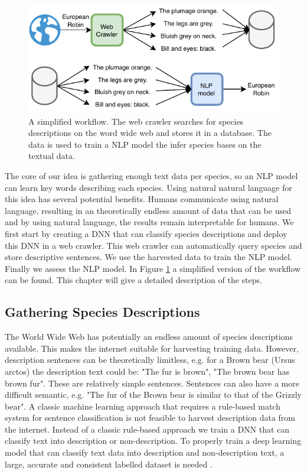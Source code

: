 \documentclass[a4paper, 12pt, oneside]{book} %
\begin{document}
\begin{figure} [h!]
    \centering
    \includegraphics[width=\textwidth]{figures/workflow_v4.pdf}
    \caption[Workflow]{A simplified workflow. The web crawler searches for species descriptions on the word wide web and stores it in a database. The data is used to train a NLP model the infer species bases on the textual data.}
    \label{fig:workflow}
\end{figure}

The core of our idea is gathering enough text data per species, so an NLP model can learn key words describing each species.
Using natural natural language for this idea has several potential benefits.
Humans communicate using natural language, resulting in an theoretically endless amount of data that can be used and by using natural language, the results remain interpretable for humans.
We first start by creating a DNN that can classify species descriptions and deploy this DNN in a web crawler.
This web crawler can automatically query species and store descriptive sentences.
We use the harvested data to train the NLP model.
Finally we assess the NLP model.
In Figure \ref{fig:workflow} a simplified version of the workflow can be found.
This chapter will give a detailed description of the steps.

\subsection{Gathering Species Descriptions} \label{par:dataset}
The World Wide Web has potentially an endless amount of species descriptions available.
This makes the internet suitable for harvesting training data.
However, description sentences can be theoretically limitless, e.g. for a Brown bear (Ursus arctos) the description text could be: "The fur is brown", "The brown bear has brown fur".
These are relatively simple sentences.
Sentences can also have a more difficult semantic, e.g. "The fur of the Brown bear is similar to that of the Grizzly bear".
A classic machine learning approach that requires a rule-based match system for sentence classification is not feasible to harvest description data from the internet.
Instead of a classic rule-based approach we train a DNN that can classify text into description or non-description.
To properly train a deep learning model that can classify text data into description and non-description text, a large, accurate and consistent labelled dataset is needed \autocite{munappy_data_2019}.
\end{document}
